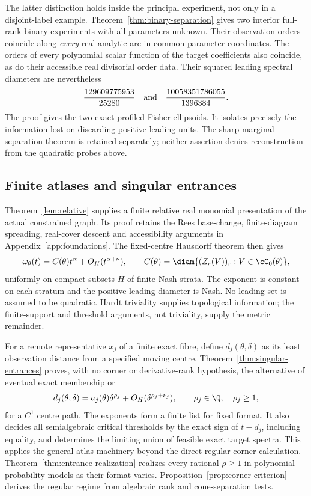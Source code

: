 The latter distinction holds inside the principal experiment, not only
in a disjoint-label example. Theorem~\ref{thm:binary-separation} gives
two interior full-rank binary experiments with all parameters unknown.
Their observation orders coincide along \emph{every} real analytic arc
in common parameter coordinates. The orders of every polynomial scalar
function of the target coefficients also coincide, as do their accessible
real divisorial order data. Their squared leading spectral diameters are
nevertheless
\[
 \frac{129609775953}{25280}\quad\hbox{and}\quad
 \frac{10058351786055}{1396384}.
\]
The proof gives the two exact profiled Fisher ellipsoids. It isolates
precisely the information lost on discarding positive leading units.
The sharp-marginal separation theorem is retained separately; neither
assertion denies reconstruction from the quadratic probes above.

\subsection*{Finite atlases and singular entrances}
Theorem~\ref{lem:relative} supplies a finite relative real monomial
presentation of the actual constrained graph. Its proof retains the
Rees base-change, finite-diagram spreading, real-cover descent and
accessibility arguments in Appendix~\ref{app:foundations}. The fixed-centre
Hausdorff theorem then gives
\[
 \omega_\theta(t)=C(\theta)t^\alpha+O_H(t^{\alpha+\nu}),
 \qquad C(\theta)=\diam\{(Z_r(V))_r:V\in\cC_0(\theta)\},
\]
uniformly on compact subsets $H$ of finite Nash strata. The exponent is
constant on each stratum and the positive leading diameter is Nash.
No leading set is assumed to be quadratic. Hardt triviality supplies
topological information; the finite-support and threshold arguments,
not triviality, supply the metric remainder.

For a remote representative $x_j$ of a finite exact fibre, define
$d_j(\theta,\delta)$ as its least observation distance from a specified
moving centre. Theorem~\ref{thm:singular-entrances} proves, with no
corner or derivative-rank hypothesis, the alternative of eventual exact
membership or
\[
 d_j(\theta,\delta)=a_j(\theta)\delta^{\rho_j}
                 +O_H(\delta^{\rho_j+\nu_j}),
 \qquad \rho_j\in\Q,\quad\rho_j\ge1,
\]
for a $C^1$ centre path. The exponents form a finite list for fixed
format. It also decides all semialgebraic critical thresholds by the
exact sign of $t-d_j$, including equality, and determines the limiting
union of feasible exact target spectra. This applies the general atlas
machinery beyond the direct regular-corner calculation.
Theorem~\ref{thm:entrance-realization} realizes every rational
$\rho\ge1$ in polynomial probability models as their format varies.
Proposition~\ref{prop:corner-criterion} derives the regular regime from
algebraic rank and cone-separation tests.

